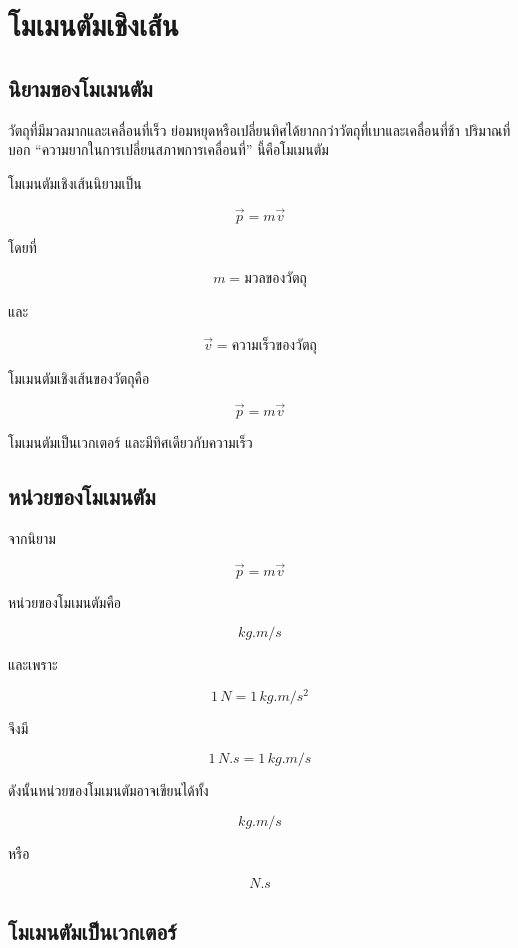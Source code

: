 \newpage{}

\section{โมเมนตัมเชิงเส้น}

\subsection{นิยามของโมเมนตัม}

วัตถุที่มีมวลมากและเคลื่อนที่เร็ว ย่อมหยุดหรือเปลี่ยนทิศได้ยากกว่าวัตถุที่เบาและเคลื่อนที่ช้า ปริมาณที่บอก ``ความยากในการเปลี่ยนสภาพการเคลื่อนที่'' นี้คือโมเมนตัม

โมเมนตัมเชิงเส้นนิยามเป็น

\[
\vec{p}=m\vec{v}
\]

โดยที่

\[
m=\text{มวลของวัตถุ}
\]

และ

\[
\vec{v}=\text{ความเร็วของวัตถุ}
\]

\begin{tcolorbox}[title=นิยาม]
โมเมนตัมเชิงเส้นของวัตถุคือ

\[
\vec{p}=m\vec{v}
\]

โมเมนตัมเป็นเวกเตอร์ และมีทิศเดียวกับความเร็ว
\end{tcolorbox}

\subsection{หน่วยของโมเมนตัม}

จากนิยาม

\[
\vec{p}=m\vec{v}
\]

หน่วยของโมเมนตัมคือ

\[
\si{kg.m/s}
\]

และเพราะ

\[
1\,\si{N}=1\,\si{kg.m/s^2}
\]

จึงมี

\[
1\,\si{N.s}=1\,\si{kg.m/s}
\]

ดังนั้นหน่วยของโมเมนตัมอาจเขียนได้ทั้ง

\[
\si{kg.m/s}
\]

หรือ

\[
\si{N.s}
\]

\subsection{โมเมนตัมเป็นเวกเตอร์}

